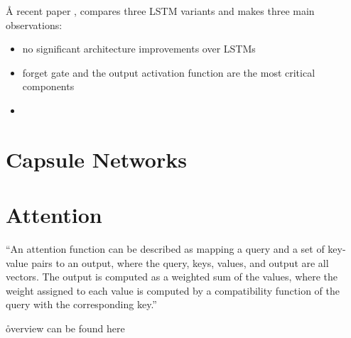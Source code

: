 \r{A recent paper , compares three LSTM variants and makes three main observations:}

\begin{itemize}[noitemsep,topsep=0pt]
	\item no significant architecture improvements over LSTMs
	\item forget gate and the output activation function are the most critical components
	\item {}
\end{itemize}




\section{Capsule Networks}


\section{Attention}

\r{``An attention function can be described as mapping a query and a set of key-value pairs to an output,
	where the query, keys, values, and output are all vectors. The output is computed as a weighted sum
	of the values, where the weight assigned to each value is computed by a compatibility function of the
	query with the corresponding key.'' \cite{DBLP:journals/corr/VaswaniSPUJGKP17}}



\r{overview can be found here\cite{weng2018attention}}







